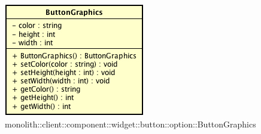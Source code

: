 \label{monolith::client::component::widget::button::option::ButtonGraphics}
\begin{figure}[H]
	\centering
	\includegraphics[scale=0.5]{Sezioni/SottosezioniST/img/ButtonGraphics.png}
	\caption{monolith::client::component::widget::button::option::ButtonGraphics}
\end{figure}

